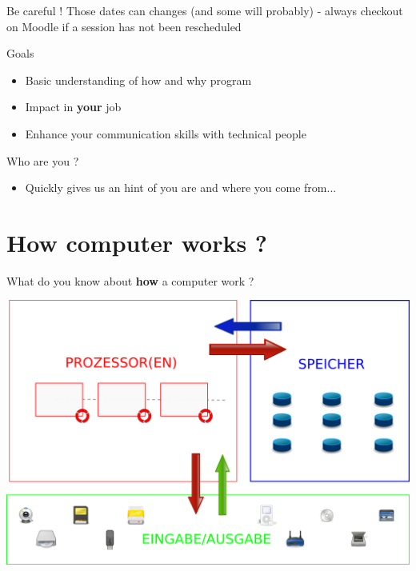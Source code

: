 {\begin{frame}
    \begin{block}{Be careful !}
      Those dates can changes (and some will probably) - always checkout on Moodle if a session has
      not been rescheduled
    \end{block}
  \end{frame}

  \begin{frame}
    \begin{block}{Goals}
      \begin{itemize}
        \item Basic understanding of how and why program
        \item Impact in \textbf{your} job
        \item Enhance your communication skills with technical people
      \end{itemize}
    \end{block}

    \begin{block}{Who are you ?}
      \begin{itemize}
        \item Quickly gives us an hint of you are and where you come from...
      \end{itemize}
    \end{block}
  \end{frame}

  \section{How computer works ?}

  \begin{frame}
    \begin{center}
        What do you know about \textbf{how} a computer work ?
    \end{center}
  \end{frame}

  \begin{frame}
   \begin{center}
     \includegraphics[scale=0.3]{img/cpu-schematics.png}
   \end{center}
  \end{frame}

}
